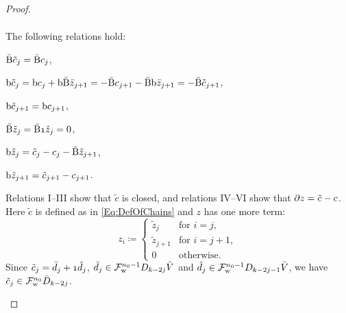 \documentclass[\MainFolder/Text.tex]{subfiles}
\begin{document}
\begin{proof}
\begin{ProofList}
\begin{align*}
\end{align*}
The following relations hold:
\begin{EqnList}
\item $\bar{\mathrm{B}} \tilde{c}_j = \bar{\mathrm{B}} c_j$,
\item $\mathrm{b} \tilde{c}_j = \mathrm{b} c_j + \mathrm{b} \bar{\mathrm{B}} \bar{z}_{j+1} = - \bar{\mathrm{B}} c_{j+1} - \bar{\mathrm{B}}  \mathrm{b} \bar{z}_{j+1} = - \bar{\mathrm{B}} \tilde{c}_{j+1}$,
\item $\mathrm{b} \tilde{c}_{j+1} = \mathrm{b} c_{j+1}$,
\item $\NCd \tilde{z}_j = \NCd \NOne \hat{z}_j = 0$,
\item $\mathrm{b} \tilde{z}_j = \tilde{c}_j - c_j - \bar{\mathrm{B}} \tilde{z}_{j+1}$,
\item $\mathrm{b} \tilde{z}_{j+1} = \tilde{c}_{j+1} - c_{j+1}$.
\end{EqnList}
Relations I--III show that $\tilde{c}$ is closed, and relations IV--VI show that $\partial z = \tilde{c} - c$. Here $\tilde{c}$ is defined as in \eqref{Eq:DefOfChains} and $z$ has one more term:
\[ z_i \coloneqq \begin{cases} \tilde{z}_j & \text{for } i = j, \\ \tilde{z}_{j+1} & \text{for } i = j+1, \\
0 & \text{otherwise}. \end{cases} \]
Since $\tilde{c}_j = \bar{d}_j + \NOne \hat{d}_j$, $\bar{d}_j\in \mathcal{F}^{n_0-1}_{\mathrm{w}}D_{k-2j}\bar{V}$ and $\hat{d}_j\in \mathcal{F}^{n_0-1}_{\mathrm{w}}D_{k-2j-1}\bar{V}$, we have $\tilde{c}_j \in \mathcal{F}^{n_0}_{\mathrm{w}} \bar{D}_{k-2j}$.


\end{ProofList}
\end{proof}
\end{document}
